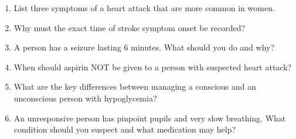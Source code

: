 \begin{enumerate}[leftmargin=*]
\item List three symptoms of a heart attack that are more common in women.
\item Why must the exact time of stroke symptom onset be recorded?
\item A person has a seizure lasting 6 minutes. What should you do and why?
\item When should aspirin NOT be given to a person with suspected heart attack?
\item What are the key differences between managing a conscious and an unconscious person with hypoglycemia?
\item An unresponsive person has pinpoint pupils and very slow breathing. What condition should you suspect and what medication may help?
\end{enumerate}
